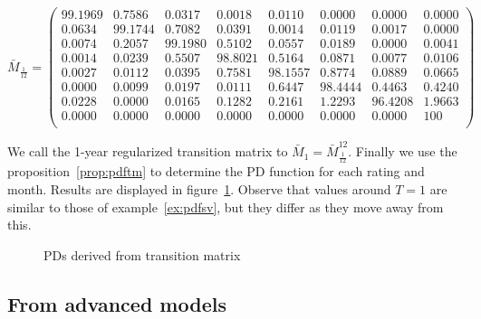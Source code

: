 \documentclass[11pt,fleqn]{book} %
\begin{document}
\begin{example}
{\begin{displaymath}
		\bar{M}_{\frac{1}{12}} = \left(
		\begin{array}{cccccccc}
			99.1969 &  0.7586 &  0.0317 &  0.0018 &  0.0110 &  0.0000 &  0.0000 &   0.0000 \\
			 0.0634 & 99.1744 &  0.7082 &  0.0391 &  0.0014 &  0.0119 &  0.0017 &   0.0000 \\
			 0.0074 &  0.2057 & 99.1980 &  0.5102 &  0.0557 &  0.0189 &  0.0000 &   0.0041 \\
			 0.0014 &  0.0239 &  0.5507 & 98.8021 &  0.5164 &  0.0871 &  0.0077 &   0.0106 \\
			 0.0027 &  0.0112 &  0.0395 &  0.7581 & 98.1557 &  0.8774 &  0.0889 &   0.0665 \\
			 0.0000 &  0.0099 &  0.0197 &  0.0111 &  0.6447 & 98.4444 &  0.4463 &   0.4240 \\
			 0.0228 &  0.0000 &  0.0165 &  0.1282 &  0.2161 &  1.2293 & 96.4208 &   1.9663 \\
			 0.0000 &  0.0000 &  0.0000 &  0.0000 &  0.0000 &  0.0000 &  0.0000 & 100 \\
		\end{array}
		\right)
	\end{displaymath}\par}
	We call the 1-year regularized transition matrix to 
	$\bar{M}_1 = \bar{M}_{\frac{1}{12}}^{12}$. 
	Finally we use the proposition~\ref{prop:pdftm} to determine the 
	PD function for each rating and month. Results are displayed in 
	figure~\ref{fig:pdftm}. Observe that values around $T=1$ are similar 
	to those of example~\ref{ex:pdfsv}, but they differ as they move 
	away from this.

	\begin{figure}[!ht]
		\centering
		\caption{PDs derived from transition matrix}
		\label{fig:pdftm}
	\end{figure}
\end{example}

\subsection{From advanced models}
\end{document}
